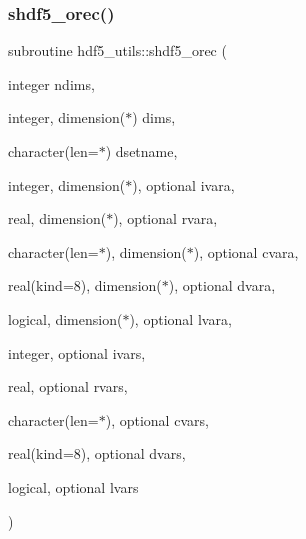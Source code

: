 \subsubsection{\texorpdfstring{shdf5\+\_\+orec()}{shdf5\_orec()}}
{\footnotesize\ttfamily subroutine hdf5\+\_\+utils\+::shdf5\+\_\+orec (\begin{DoxyParamCaption}\item[{integer}]{ndims,  }\item[{integer, dimension($\ast$)}]{dims,  }\item[{character(len=$\ast$)}]{dsetname,  }\item[{integer, dimension($\ast$), optional}]{ivara,  }\item[{real, dimension($\ast$), optional}]{rvara,  }\item[{character(len=$\ast$), dimension($\ast$), optional}]{cvara,  }\item[{real(kind=8), dimension($\ast$), optional}]{dvara,  }\item[{logical, dimension($\ast$), optional}]{lvara,  }\item[{integer, optional}]{ivars,  }\item[{real, optional}]{rvars,  }\item[{character(len=$\ast$), optional}]{cvars,  }\item[{real(kind=8), optional}]{dvars,  }\item[{logical, optional}]{lvars }\end{DoxyParamCaption})}

\mbox{\label{namespacehdf5__utils_a2ede1f04f554f0906040f2802b2ccbd3}} 
